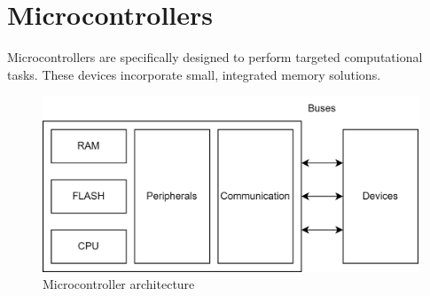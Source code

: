 \section{Microcontrollers}

Microcontrollers are specifically designed to perform targeted computational tasks. 
These devices incorporate small, integrated memory solutions.
\begin{figure}[H]
    \centering
    \includegraphics[width=0.75\linewidth]{images/miccon.png}
    \caption{Microcontroller architecture}
\end{figure}

